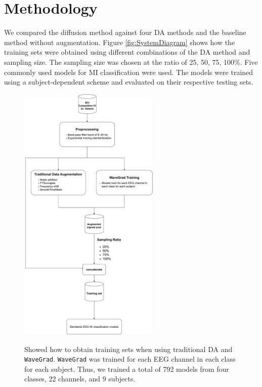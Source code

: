 \section{Methodology}
We compared the diffusion method against four DA methods and the baseline method without augmentation.
Figure \ref{fig:SystemDiagram} shows how the training sets were obtained using different combinations of the DA method and sampling size.
The sampling size was chosen at the ratio of 25, 50, 75, 100\%.
Five commonly used models for MI classification were used.
The models were trained using a subject-dependent scheme and evaluated on their respective testing sets. 

\begin{figure}[ht]
  \centering
  \caption[System Diagram]{\label{fig:SystemDiagram} Showed how to obtain training sets when using traditional DA and \texttt{WaveGrad}. \texttt{WaveGrad} was trained for each EEG channel in each class for each subject. Thus, we trained a total of 792 models from four classes, 22 channels, and 9 subjects.}
  \includegraphics[width=0.6\textwidth]{fig/dyagram.pdf}
  \label{fig:System}
\end{figure}

